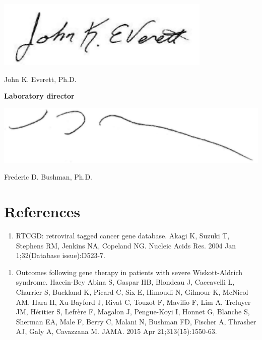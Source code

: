 \documentclass[12pt,]{article}
\providecommand{\tightlist}{%
  \setlength{\itemsep}{0pt}\setlength{\parskip}{0pt}}
\begin{document}
\includegraphics[width=4.04in]{./data/Everett_signature}

John K. Everett, Ph.D.

\vspace{0.5cm}

\textbf{Laboratory director}

\includegraphics[width=5.99in]{./data/Bushman_signature}

Frederic D. Bushman, Ph.D.

\vspace{2.0cm}

\section{References}\label{references}

\begin{enumerate}
\def\labelenumi{\arabic{enumi}.}
\tightlist
\item
  RTCGD: retroviral tagged cancer gene database. Akagi K, Suzuki T,
  Stephens RM, Jenkins NA, Copeland NG. Nucleic Acids Res. 2004 Jan
  1;32(Database issue):D523-7.
\end{enumerate}

\vspace{0.1cm}

\begin{enumerate}
\def\labelenumi{\arabic{enumi}.}
\setcounter{enumi}{1}
\tightlist
\item
  Outcomes following gene therapy in patients with severe
  Wiskott-Aldrich syndrome. Hacein-Bey Abina S, Gaspar HB, Blondeau J,
  Caccavelli L, Charrier S, Buckland K, Picard C, Six E, Himoudi N,
  Gilmour K, McNicol AM, Hara H, Xu-Bayford J, Rivat C, Touzot F,
  Mavilio F, Lim A, Treluyer JM, Héritier S, Lefrère F, Magalon J,
  Pengue-Koyi I, Honnet G, Blanche S, Sherman EA, Male F, Berry C,
  Malani N, Bushman FD, Fischer A, Thrasher AJ, Galy A, Cavazzana M.
  JAMA. 2015 Apr 21;313(15):1550-63.
\end{enumerate}
\end{document}
